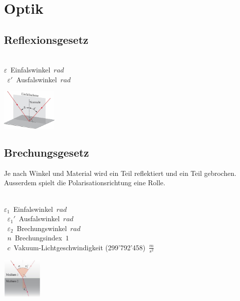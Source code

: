 \section{Optik}
\subsection{Reflexionsgesetz}

\begin{center}
	\begin{minipage}{0.3\textwidth}
		 \\
	
		\unit{$\varepsilon$}{Einfalswinkel}{$rad$} \\
		\unit{$\varepsilon'$}{Ausfalswinkel}{$rad$}
	\end{minipage}%
	\begin{minipage}{0.3\textwidth}
		\includegraphics[height=2cm,keepaspectratio=true]{Images/reflexionsgesetz.png}
	\end{minipage}
\end{center}




\subsection{Brechungsgesetz}

Je nach Winkel und Material wird ein Teil reflektiert und ein Teil gebrochen. Ausserdem spielt die Polarisationsrichtung eine Rolle.

\begin{center}
	\begin{minipage}{0.3\textwidth}
		\\
	
		\unit{$\varepsilon_1$}{Einfalswinkel}{$rad$} \\
		\unit{$\varepsilon_1'$}{Ausfalswinkel}{$rad$} \\
		\unit{$\varepsilon_2$}{Brechungswinkel}{$rad$} \\
		\unit{$n$}{Brechungsindex}{$1$} \\
		\unit{$c$}{Vakuum-Lichtgeschwindigkeit (299'792'458)}{$\frac{m}{s^2}$}	
	\end{minipage}%
	\begin{minipage}{0.3\textwidth}
		\includegraphics[height=2cm,keepaspectratio=true]{Images/brechungsgesetz.png}
	\end{minipage}
\end{center}





